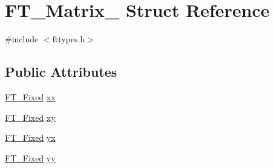 \hypertarget{struct_f_t___matrix__}{\section{F\-T\-\_\-\-Matrix\-\_\- Struct Reference}
\label{struct_f_t___matrix__}
}


{\ttfamily \#include $<$fttypes.\-h$>$}

\subsection*{Public Attributes}
\begin{DoxyCompactItemize}
\item 
\hyperlink{fttypes_8h_a5f5a679cc09f758efdd0d1c5feed3c3d}{F\-T\-\_\-\-Fixed} \hyperlink{struct_f_t___matrix___a27d51c2958634abe7bf377610e095f74}{xx}
\item 
\hyperlink{fttypes_8h_a5f5a679cc09f758efdd0d1c5feed3c3d}{F\-T\-\_\-\-Fixed} \hyperlink{struct_f_t___matrix___a7e9f439d37c00ba1a11919bcaa8937a2}{xy}
\item 
\hyperlink{fttypes_8h_a5f5a679cc09f758efdd0d1c5feed3c3d}{F\-T\-\_\-\-Fixed} \hyperlink{struct_f_t___matrix___a55792583a843a1611b43c40534a02a17}{yx}
\item 
\hyperlink{fttypes_8h_a5f5a679cc09f758efdd0d1c5feed3c3d}{F\-T\-\_\-\-Fixed} \hyperlink{struct_f_t___matrix___a689a6fd20a88238788b90c3597ee0c2a}{yy}
\end{DoxyCompactItemize}


